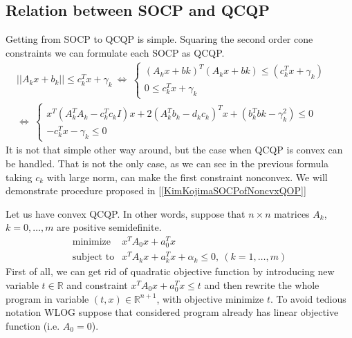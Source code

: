 \documentclass[10pt,oneside]{book}
\theoremstyle{definition}
\begin{document}
\subsection{Relation between SOCP and QCQP}
\label{SectionRelBtwSOCPandQCQP}

Getting from SOCP to QCQP is simple. 
Squaring the second order cone constraints we can formulate each SOCP as QCQP.
\begin{eqnarray}
||A_kx+b_k|| \leq c_k^Tx + \gamma_k \ \Leftrightarrow \ 
\left\lbrace \begin{array}{l}
(A_kx+bk)^T(A_kx+bk)\leq (c_k^Tx + \gamma_k)\\
0 \leq c_k^Tx + \gamma_k 
\end{array}\right.  & & \\
\Leftrightarrow \ 
\left\lbrace \begin{array}{l}
x^T(A_k^TA_k-c_k^Tc_kI)x + 2(A_k^Tb_k-d_kc_k)^Tx +(b_k^Tbk-\gamma_k^2) \leq 0  \\
-c_k^Tx - \gamma_k \leq 0 
\end{array}\right.  & & 
\label{Socp2Qcqp}
\end{eqnarray}
It is not that simple other way around, but the case when QCQP is convex can be handled.
That is not the only case, as we can see in the previous formula taking $c_k$ with large norm, 
can make the first constraint nonconvex. 
We will demonstrate procedure proposed in [\ref{KimKojimaSOCPofNoncvxQOP}]

Let us have convex QCQP. In other words, suppose that $n\times n$ matrices $A_k$, $k=0,\dots ,m$ are positive semidefinite.
\begin{equation}
\begin{array}{ll}
\mbox{minimize}& x^TA_0x + a_0^Tx \\
\mbox{subject to}& x^TA_kx + a_k^Tx + \alpha_k \leq 0, \  (k = 1,\dots ,m)
\end{array} 
\end{equation}
First of all, we can get rid of quadratic objective function by introducing new variable $t\in \mathbb{R}$ and constraint $x^TA_0x + a_0^Tx \leq t$ and then rewrite the whole program in variable $(t,x)\in \mathbb{R}^{n+1}$, with objective minimize $t$. To avoid tedious notation WLOG suppose that considered program already has linear objective function (i.e. $A_0 = 0$). 
\end{document}
